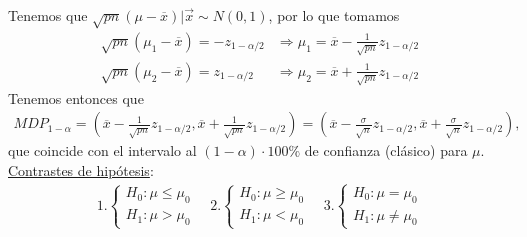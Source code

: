Tenemos que $\sqrt{pn}(\mu - \overline{x}) | \vec{x} \sim N(0,1)$, por lo que tomamos
\begin{align*}
    \sqrt{pn}(\mu_1 - \overline{x}) = - z_{1 - \alpha/2} &\Longrightarrow \mu_1 = \overline{x} - \frac{1}{\sqrt{pn}}z_{1 - \alpha/2} \\
    \sqrt{pn}(\mu_2 - \overline{x}) = z_{1 - \alpha/2} &\Longrightarrow \mu_2 = \overline{x} + \frac{1}{\sqrt{pn}}z_{1 - \alpha/2}
\end{align*}
Tenemos entonces que 
\begin{align*}
    MDP_{1-\alpha} = \left( \overline{x}- \frac{1}{\sqrt{pn}}z_{1 - \alpha/2}, \overline{x} + \frac{1}{\sqrt{pn}}z_{1 - \alpha/2} \right) = \left( \overline{x}- \frac{\sigma}{\sqrt{n}}z_{1 - \alpha/2}, \overline{x} + \frac{\sigma}{\sqrt{n}}z_{1 - \alpha/2} \right),
\end{align*}
que coincide con el intervalo al $(1 - \alpha) \cdot 100 \%$ de confianza (clásico) para $\mu$.
\\
\newline
\noindent \underline{Contrastes de hipótesis}:
\begin{align*}
   1. \begin{cases}
        H_0 : \mu \leq \mu_0 \\
        H_1 : \mu > \mu_0
    \end{cases} \quad     2.\begin{cases}
        H_0 : \mu \ge \mu_0 \\
        H_1 : \mu < \mu_0
    \end{cases} \quad     3.\begin{cases}
        H_0 : \mu = \mu_0 \\
        H_1 : \mu \not = \mu_0
    \end{cases}
\end{align*}

